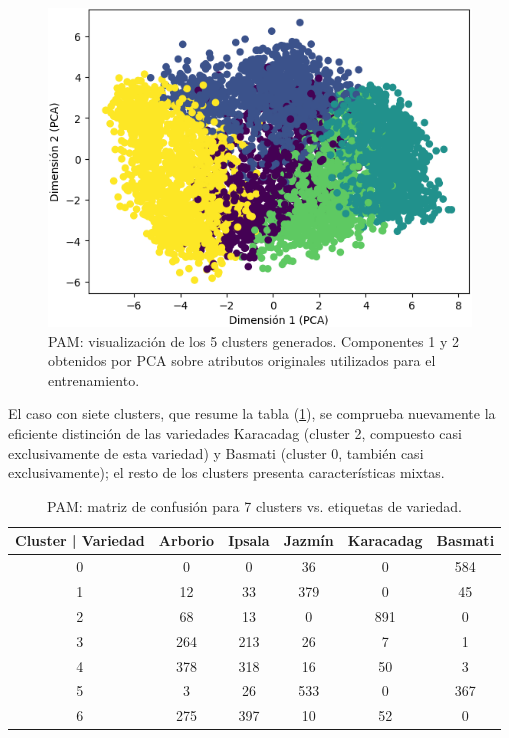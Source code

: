 \documentclass{article}
\begin{document}
\begin{figure} [!htb]
	\centering
	\includegraphics[height= 8.0 cm]{fg/PCA_clusters_PAM.png}
	\caption{PAM: visualización de los 5 clusters generados. Componentes 1 y 2 obtenidos por PCA sobre atributos originales utilizados para el entrenamiento.}	
    \label{fg_PCA_clusters_PAM}
\end{figure}

El caso con siete clusters, que resume la tabla (\ref{tab:mc_PAM7}), se comprueba nuevamente la eficiente distinción de las variedades Karacadag (cluster 2, compuesto casi exclusivamente de esta variedad) y Basmati (cluster 0, también casi exclusivamente); el resto de los clusters presenta características mixtas.

\begin{table}
    \centering
    \begin{tabular}{cccccc}
    \toprule
    Cluster | Variedad &  Arborio&  Ipsala&  Jazmín&  Karacadag& Basmati\\
    \midrule
    0 & 0 & 0 & 36 & 0 & 584 \\
    1 & 12 & 33 & 379 & 0 & 45 \\
    2 & 68 & 13 & 0 & 891 & 0 \\
    3 & 264 & 213 & 26 & 7 & 1 \\
    4 & 378 & 318 & 16 & 50 & 3 \\
    5 & 3 & 26 & 533 & 0 & 367 \\
    6 & 275 & 397 & 10 & 52 & 0 \\
    \bottomrule
    \end{tabular}
    \caption{PAM: matriz de confusión para 7 clusters vs. etiquetas de variedad.}
    \label{tab:mc_PAM7}
\end{table}
\end{document}
